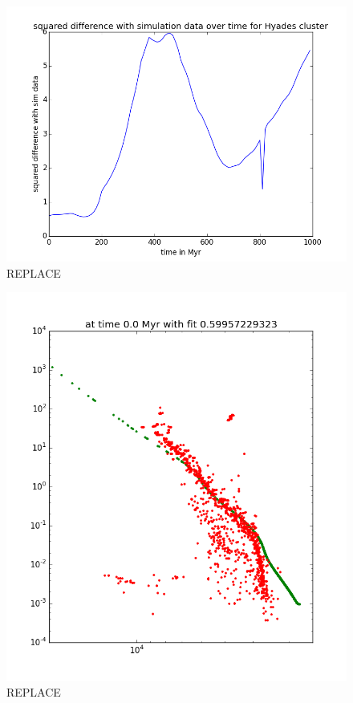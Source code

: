 \documentclass{aa}
\begin{document}
\begin{figure}
    \centering
    \includegraphics[width=\hsize]{img/fitness_over_time.png}
    \caption{REPLACE}\label{fig:chisq}
\end{figure}

\begin{figure}
    \centering
    \includegraphics[width=\hsize]{img/test0.png}
    \caption{REPLACE}\label{fig:ZAMS}
\end{figure}
\end{document}
